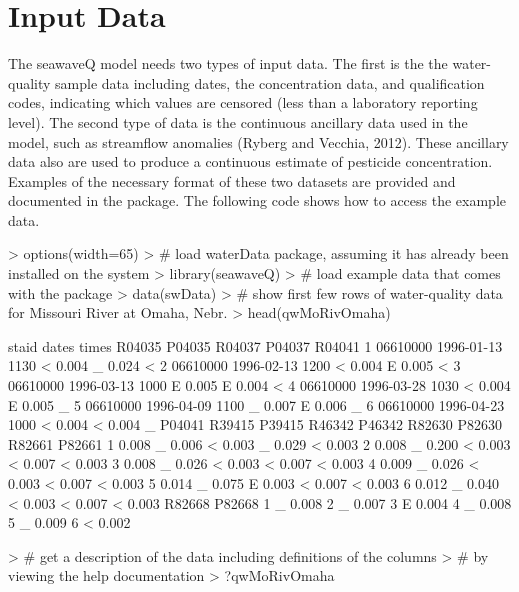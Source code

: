 \documentclass[11pt]{article}
\begin{document}
\section{Input Data}

The seawaveQ model needs two types of input data.  The first is the the water-quality sample data including dates, the concentration data, and qualification codes, indicating which values are censored (less than a laboratory reporting level).  The second type of data is the continuous ancillary data used in the model, such as streamflow anomalies (Ryberg and Vecchia, 2012).  These ancillary data also are used to produce a continuous estimate of pesticide concentration.  Examples of the necessary format of these two datasets are provided and documented in the package.  The following code shows how to access the example data.
\vspace{5 mm}

\begin{Schunk}
\begin{Sinput}
> options(width=65)
> # load waterData package, assuming it has already been installed on the system
> library(seawaveQ)
> # load example data that comes with the package
> data(swData)
> # show first few rows of water-quality data for Missouri River at Omaha, Nebr.
> head(qwMoRivOmaha)
\end{Sinput}
\begin{Soutput}
     staid      dates times R04035 P04035 R04037 P04037 R04041
1 06610000 1996-01-13  1130      <  0.004      _  0.024      <
2 06610000 1996-02-13  1200      <  0.004      E  0.005      <
3 06610000 1996-03-13  1000      E  0.005      E  0.004      <
4 06610000 1996-03-28  1030      <  0.004      E  0.005      _
5 06610000 1996-04-09  1100      _  0.007      E  0.006      _
6 06610000 1996-04-23  1000      <  0.004      <  0.004      _
  P04041 R39415 P39415 R46342 P46342 R82630 P82630 R82661 P82661
1  0.008      _  0.006      <  0.003      _  0.029      <  0.003
2  0.008      _  0.200      <  0.003      <  0.007      <  0.003
3  0.008      _  0.026      <  0.003      <  0.007      <  0.003
4  0.009      _  0.026      <  0.003      <  0.007      <  0.003
5  0.014      _  0.075      E  0.003      <  0.007      <  0.003
6  0.012      _  0.040      <  0.003      <  0.007      <  0.003
  R82668 P82668
1      _  0.008
2      _  0.007
3      E  0.004
4      _  0.008
5      _  0.009
6      <  0.002
\end{Soutput}
\begin{Sinput}
> # get a description of the data including definitions of the columns
> # by viewing the help documentation
> ?qwMoRivOmaha
\end{Sinput}
\end{Schunk}
\end{document}
